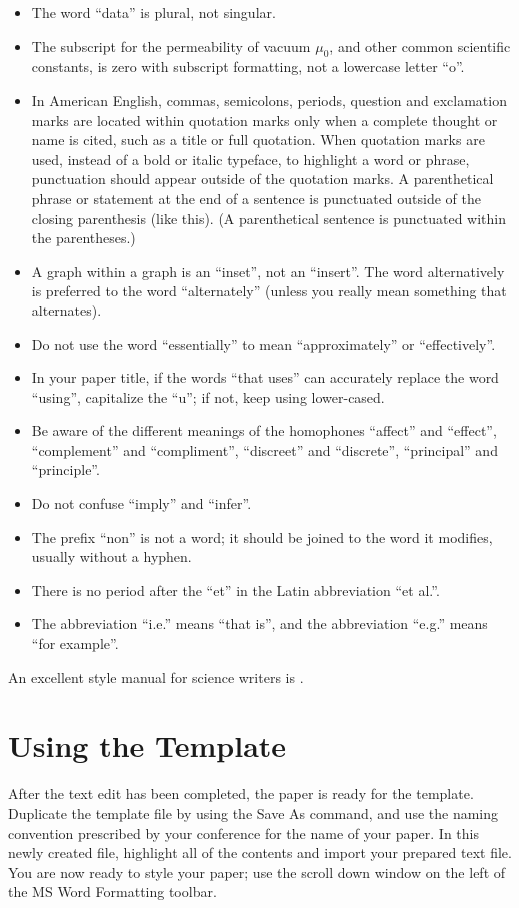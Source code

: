 \documentclass[conference, letter]{IEEEtran}
\begin{document}
\begin{itemize}
\item The word ``data'' is plural, not singular.
\item The subscript for the permeability of vacuum $\mu_{0}$, and other common scientific constants, is zero with subscript formatting, not a lowercase letter ``o''.
\item In American English, commas, semicolons, periods, question and exclamation marks are located within quotation marks only when a complete thought or name is cited, such as a title or full quotation. When quotation marks are used, instead of a bold or italic typeface, to highlight a word or phrase, punctuation should appear outside of the quotation marks. A parenthetical phrase or statement at the end of a sentence is punctuated outside of the closing parenthesis (like this). (A parenthetical sentence is punctuated within the parentheses.)
\item A graph within a graph is an ``inset'', not an ``insert''. The word alternatively is preferred to the word ``alternately'' (unless you really mean something that alternates).
\item Do not use the word ``essentially'' to mean ``approximately'' or ``effectively''.
\item In your paper title, if the words ``that uses'' can accurately replace the word ``using'', capitalize the ``u''; if not, keep using lower-cased.
\item Be aware of the different meanings of the homophones ``affect'' and ``effect'', ``complement'' and ``compliment'', ``discreet'' and ``discrete'', ``principal'' and ``principle''.
\item Do not confuse ``imply'' and ``infer''.
\item The prefix ``non'' is not a word; it should be joined to the word it modifies, usually without a hyphen.
\item There is no period after the ``et'' in the Latin abbreviation ``et al.''.
\item The abbreviation ``i.e.'' means ``that is'', and the abbreviation ``e.g.'' means ``for example''.
\end{itemize}
An excellent style manual for science writers is \cite{b7}.

\section{Using the Template}

After the text edit has been completed, the paper is ready for the template. Duplicate the template file by using the Save As command, and use the naming convention prescribed by your conference for the name of your paper. In this newly created file, highlight all of the contents and import your prepared text file. You are now ready to style your paper; use the scroll down window on the left of the MS Word Formatting toolbar.
\end{document}
